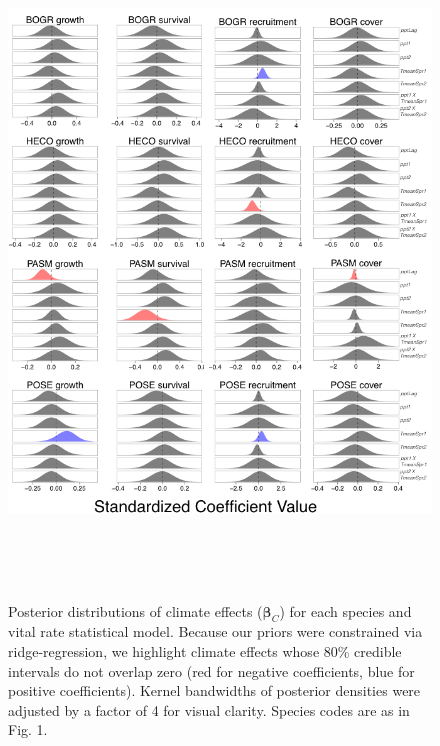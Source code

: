 \documentclass[12pt,]{article}
\begin{document}
\begin{figure}[!ht]
  \centering
      \includegraphics[height=7in]{./components/climate_posteriors_figure.png}
  \caption{Posterior distributions of climate effects ($\boldsymbol{\beta}_C$) for each species and vital rate statistical model. Because our priors were constrained via ridge-regression, we highlight climate effects whose 80\% credible intervals do not overlap zero (red for negative coefficients, blue for positive coefficients). Kernel bandwidths of posterior densities were adjusted by a factor of 4 for visual clarity. Species codes are as in Fig. 1.}
\end{figure}

\newpage{}
\end{document}
